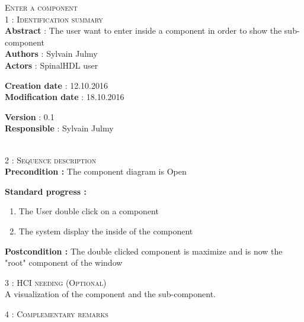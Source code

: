 \begin{flushleft}
    \textsc{\huge Enter a component}\\[0.5cm]

    \BlackLine
    \textsc{\Large 1 : Identification summary}\\[0.3cm]

        \textbf{\large Abstract} : The user want to enter inside a component in order to show the sub-component \\[0.1cm]

        \textbf{\large Authors} : Sylvain Julmy \\[0.3cm]

        \textbf{\large Actors} : SpinalHDL user \\[0.1cm]

    \begin{minipage}{0.40\textwidth}
        \begin{flushleft}	
            \textbf{\large Creation date} : 12.10.2016 \\[0.1cm]

            \textbf{\large Modification date} : 18.10.2016 \\[0.1cm]
        \end{flushleft}
    \end{minipage}
    \begin{minipage}{0.40\textwidth}
        \begin{flushleft}
            \textbf{\large Version} : 0.1 \\[0.1cm]

            \textbf{\large Responsible} : Sylvain Julmy \\[0.1cm]
        \end{flushleft}
    \end{minipage}
    \\[0.5cm]
    \BlackLine
    \textsc{\Large 2 : Sequence description}\\[0.3cm]

    \textbf{\large Precondition :} The component diagram is Open

    \textbf{\large  Standard progress :}
    \begin{enumerate}[nosep]
        \item The User double click on a component
        \item The system display the inside of the component
    \end{enumerate}

    \textbf{\large Postcondition :} The double clicked component is maximize and is now the "root" component of the window

    \BlackLine
    \textsc{\Large 3 : HCI needing (Optional)}\\[0.3cm]

    A visualization of the component and the sub-component.

    \BlackLine
    \textsc{\Large 4 : Complementary remarks}\\[0.3cm]



\end{flushleft}

